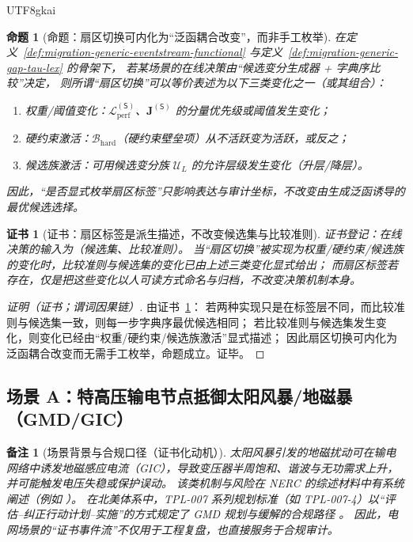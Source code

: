 \documentclass[12pt]{article}
\newtheorem{proposition}{命题}[section]
\newtheorem{remark}{备注}[section]
\newtheorem{Certificate}{证书}[section]
\begin{document}
\begin{CJK*}{UTF8}{gkai}
\begin{proposition}[命题：扇区切换可内化为“泛函耦合改变”，而非手工枚举]
\label{prop:migration-sector-switch-as-functional-coupling}
在定义~\ref{def:migration-generic-eventstream-functional} 与定义~\ref{def:migration-generic-gap-tau-lex} 的骨架下，
若某场景的在线决策由“候选变分生成器 + 字典序比较”决定，
则所谓“扇区切换”可以等价表述为以下三类变化之一（或其组合）：
\begin{enumerate}
  \item 权重/阈值变化：$\mathcal{L}_{\mathrm{perf}}^{(\mathsf{S})}$、$\mathbf{J}^{(\mathsf{S})}$ 的分量优先级或阈值发生变化；
  \item 硬约束激活：$\mathcal{B}_{\mathrm{hard}}$（硬约束壁垒项）从不活跃变为活跃，或反之；
  \item 候选族激活：可用候选变分族 $\mathcal{U}_L$ 的允许层级发生变化（升层/降层）。
\end{enumerate}
因此，“是否显式枚举扇区标签”只影响表达与审计坐标，不改变由生成泛函诱导的最优候选选择。
\end{proposition}

\begin{Certificate}[证书：扇区标签是派生描述，不改变候选集与比较准则]
\label{cert:migration-sector-switch-as-functional-coupling}
证书登记：在线决策的输入为（候选集、比较准则）。
当“扇区切换”被实现为权重/硬约束/候选族的变化时，比较准则与候选集的变化已由上述三类变化显式给出；
而扇区标签若存在，仅是把这些变化以人可读方式命名与归档，不改变决策机制本身。
\end{Certificate}

\begin{proof}[证明（证书；谓词因果链）]
由证书~\ref{cert:migration-sector-switch-as-functional-coupling}：
若两种实现只是在标签层不同，而比较准则与候选集一致，则每一步字典序最优候选相同；
若比较准则与候选集发生变化，则变化已经由“权重/硬约束/候选族激活”显式描述；
因此扇区切换可内化为泛函耦合改变而无需手工枚举，命题成立。证毕。
\end{proof}

\subsection{场景 A：特高压输电节点抵御太阳风暴/地磁暴（GMD/GIC）}
\label{sec:migration-uhv-gmd}

\begin{remark}[场景背景与合规口径（证书化动机）]
太阳风暴引发的地磁扰动可在输电网络中诱发地磁感应电流（GIC），导致变压器半周饱和、谐波与无功需求上升，并可能触发电压失稳或保护误动。
该类机制与风险在 NERC 的综述材料中有系统阐述（例如 \cite{ref_nerc_gmd_report_2012,ref_nerc_gmd_planning_guide_2013}）。
在北美体系中，\textsf{TPL-007} 系列规划标准（如 \textsf{TPL-007-4}）以“评估--纠正行动计划--实施”的方式规定了 GMD 规划与缓解的合规路径 \cite{ref_nerc_tpl_007_4}。
因此，电网场景的“证书事件流”不仅用于工程复盘，也直接服务于合规审计。
\end{remark}


\end{CJK*}
\end{document}
